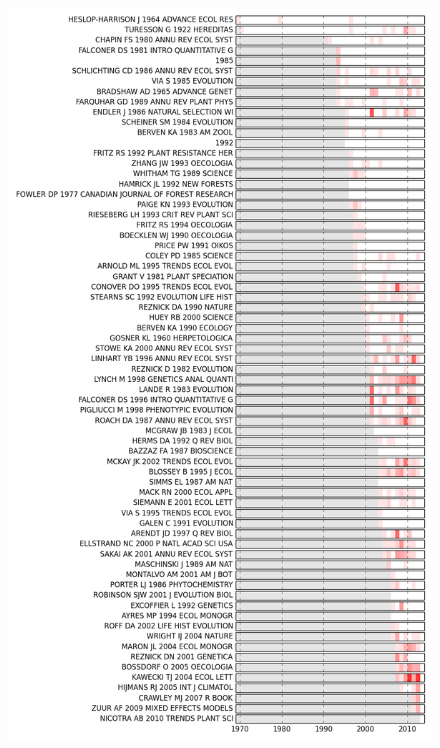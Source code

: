 \documentclass[letterpaper,10pt,english]{sphinxmanual}
\begin{document}
\begin{fulllineitems}
\begin{figure}[htbp]
\includegraphics{sigma_plot.png}
\end{figure}

\end{fulllineitems}

\end{document}
